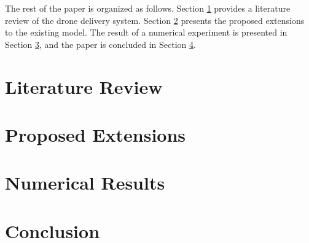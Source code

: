 \documentclass{lxaiproposal}
\begin{document}
The rest of the paper is organized as follows. Section \ref{section:lit_review} provides a literature review of the drone delivery system. Section \ref{section:extensions} presents the proposed extensions to the existing model. The result of a numerical experiment is presented in Section \ref{section:results}, and the paper is concluded in Section \ref{section:conclusion}.

\section{Literature Review} \label{section:lit_review}
\vspace*{-3mm}



\section{Proposed Extensions} \label{section:extensions}
\vspace*{-3mm}


\section{Numerical Results} \label{section:results}

\section{Conclusion} \label{section:conclusion}
\vspace*{-3mm}










\end{document}
